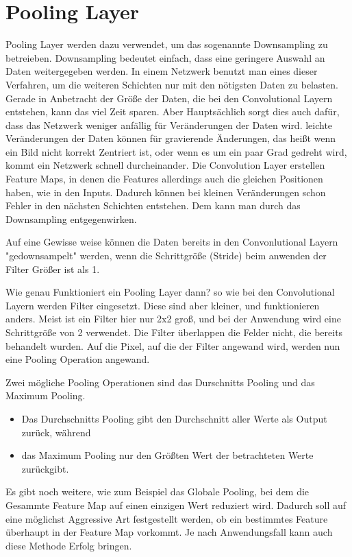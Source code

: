 \documentclass[12pt]{article}
\begin{document}
\section{Pooling Layer}
Pooling Layer werden dazu verwendet, um das sogenannte Downsampling zu betreieben. Downsampling bedeutet einfach, dass eine geringere Auswahl an Daten weitergegeben werden.
In einem Netzwerk benutzt man eines dieser Verfahren, um die weiteren Schichten nur mit den nötigsten Daten zu belasten. Gerade in Anbetracht der Größe der Daten, die bei den Convolutional Layern entstehen, kann das viel Zeit sparen. Aber Hauptsächlich sorgt dies auch dafür, dass das Netzwerk weniger anfällig für Veränderungen der Daten wird. leichte Veränderungen der Daten können für gravierende Änderungen, das heißt wenn ein Bild nicht korrekt Zentriert ist, oder wenn es um ein paar Grad gedreht wird, kommt ein Netzwerk schnell durcheinander.
Die Convolution Layer erstellen Feature Maps, in denen die Features allerdings auch die gleichen Positionen haben, wie in den Inputs. Dadurch können bei kleinen Veränderungen schon Fehler in den nächsten Schichten entstehen. Dem kann man durch das Downsampling entgegenwirken.

Auf eine Gewisse weise können die Daten bereits in den Convonlutional Layern "gedownsampelt" werden, wenn die Schrittgröße (Stride) beim anwenden der Filter Größer ist als 1.

Wie genau Funktioniert ein Pooling Layer dann? so wie bei den Convolutional Layern werden Filter eingesetzt. Diese sind aber kleiner, und funktionieren anders. Meist ist ein Filter hier nur 2x2 groß, und bei der Anwendung wird eine Schrittgröße von 2 verwendet. Die Filter überlappen die Felder nicht, die bereits behandelt wurden. 
Auf die Pixel, auf die der Filter angewand wird, werden nun eine Pooling Operation angewand. 

Zwei mögliche Pooling Operationen sind das Durschnitts Pooling und das Maximum Pooling. 
\begin{itemize}
  \item Das Durchschnitts Pooling gibt den Durchschnitt aller Werte als Output zurück, während
  \item das Maximum Pooling nur den Größten Wert der betrachteten Werte zurückgibt.
\end{itemize}
Es gibt noch weitere, wie zum Beispiel das Globale Pooling, bei dem die Gesammte Feature Map auf einen einzigen Wert reduziert wird. Dadurch soll auf eine möglichst Aggressive Art festgestellt werden, ob ein bestimmtes Feature überhaupt in der Feature Map vorkommt. Je nach Anwendungsfall kann auch diese Methode Erfolg bringen.
\end{document}
